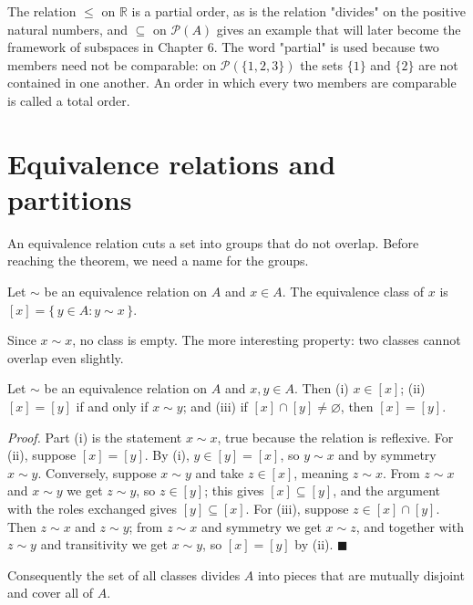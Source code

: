 The relation $\le$ on $\mathbb{R}$ is a partial order, as is the relation "divides" on
the positive natural numbers, and $\subseteq$ on $\mathcal{P}(A)$ gives an example
that will later become the framework of subspaces in Chapter 6. The word "partial" is
used because two members need not be comparable: on $\mathcal{P}(\{1,2,3\})$ the sets
$\{1\}$ and $\{2\}$ are not contained in one another. An order in which every two
members are comparable is called a total order.

\section{Equivalence relations and partitions}

An equivalence relation cuts a set into groups that do not overlap. Before reaching
the theorem, we need a name for the groups.

\begin{definisi}
Let $\sim$ be an equivalence relation on $A$ and $x \in A$. The equivalence class of
$x$ is $[x] = \{\, y \in A : y \sim x \,\}$.
\end{definisi}

Since $x \sim x$, no class is empty. The more interesting property: two classes cannot
overlap even slightly.

\begin{lemma}
Let $\sim$ be an equivalence relation on $A$ and $x, y \in A$. Then (i) $x \in [x]$;
(ii) $[x] = [y]$ if and only if $x \sim y$; and (iii) if
$[x] \cap [y] \neq \varnothing$, then $[x] = [y]$.
\end{lemma}
\par\smallskip\noindent\textit{Proof.} Part (i) is the statement $x \sim x$, true
because the relation is reflexive. For (ii), suppose $[x] = [y]$. By (i),
$y \in [y] = [x]$, so $y \sim x$ and by symmetry $x \sim y$. Conversely, suppose
$x \sim y$ and take $z \in [x]$, meaning $z \sim x$. From $z \sim x$ and
$x \sim y$ we get $z \sim y$, so $z \in [y]$; this gives
$[x] \subseteq [y]$, and the argument with the roles exchanged gives
$[y] \subseteq [x]$. For (iii), suppose $z \in [x] \cap [y]$. Then $z \sim x$ and
$z \sim y$; from $z \sim x$ and symmetry we get $x \sim z$, and together with
$z \sim y$ and transitivity we get $x \sim y$, so $[x] = [y]$ by (ii).
\hfill$\blacksquare${\parfillskip=0pt\par}

Consequently the set of all classes divides $A$ into pieces that are mutually disjoint
and cover all of $A$.

